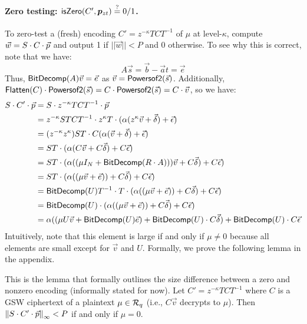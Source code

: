 \paragraph{Zero testing:  $\mathsf{isZero}(C', \bm{p}_{zt}) \stackrel{?}{=} 0/1$.}  To zero-test a (fresh) encoding $C' = z^{-\kappa} T C T^{-1}$ of $\mu$ at level-$\kappa$, compute $\vec{w} = S\cdot C\cdot \vec{p}$ and output 1 if $||\vec{w}|| < P$ and 0 otherwise.  To see why this is correct, note that we have:  $$A\vec{s} = \vec{b} - \vec{a}t = \vec{e}$$  Thus, $\mathsf{BitDecomp}(A)\vec{v} = \vec{e}$ as $\vec{v} = \mathsf{Powersof2}(\vec{s})$.  Additionally, $\mathsf{Flatten}(C)\cdot\mathsf{Powersof2}(\vec{s}) = C\cdot \mathsf{Powersof2}(\vec{s}) = C\cdot\vec{v}$, so we have:
\begin{align*}
S\cdot C'\cdot \vec{p} &= S \cdot z^{-\kappa} T C T^{-1} \cdot \vec{p} \\
&= z^{-\kappa} ST C  T^{-1} \cdot z^\kappa T\cdot (\alpha(z^\kappa\vec{v} + \vec{\delta}) + \vec{\epsilon})\\
&= (z^{-\kappa} z^{\kappa}) ST \cdot C (\alpha(\vec{v} + \vec{\delta}) + \vec{\epsilon})\\
&= ST \cdot (\alpha(C\vec{v} + C\vec{\delta}) + C\vec{\epsilon})\\
&= ST \cdot (\alpha((\mu I_{N} + \mathsf{BitDecomp}(R\cdot A)))\vec{v} + C\vec{\delta}) + C\vec{\epsilon})\\
&= ST \cdot (\alpha((\mu \vec{v} + \vec{e})) + C\vec{\delta}) + C\vec{\epsilon})\\
&= \mathsf{BitDecomp}(U)T^{-1}\cdot T \cdot (\alpha((\mu \vec{v} + \vec{e})) + C\vec{\delta}) + C\vec{\epsilon})\\
&= \mathsf{BitDecomp}(U) \cdot (\alpha((\mu \vec{v} + \vec{e})) + C\vec{\delta}) + C\vec{\epsilon})\\
&= \alpha((\mu U \vec{v} + \mathsf{BitDecomp}(U)\vec{e}) + \mathsf{BitDecomp}(U)\cdot C\vec{\delta}) + \mathsf{BitDecomp}(U)\cdot C\vec{\epsilon}\\
\end{align*} 
Intuitively, note that this element is large if and only if $\mu \not= 0$ because all elements are small except for $\vec{v}$ and $U$.  Formally, we prove the following lemma in the appendix.

\begin{lemma}
\label{zerotesting}
This is the lemma that formally outlines the size difference between a zero and nonzero encoding (informally stated for now).  Let $C' = z^{-\kappa} TCT^{-1}$ where $C$ is a GSW ciphertext of a plaintext $\mu \in \mathcal{R}_q$ (i.e., $C\vec{v}$ decrypts to $\mu$).  Then $\left\lVert S\cdot C' \cdot \vec{p}\right\rVert_\infty < P$ if and only if $\mu = 0$.
\end{lemma}

